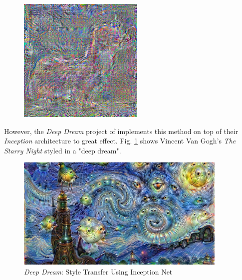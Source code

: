 \documentclass{article}
\begin{document}
\begin{figure}
\begin{minipage}{0.3\linewidth}
    \end{minipage}
    \begin{minipage}{0.3\linewidth}
    \includegraphics[width=\textwidth]{img/other-models/alex-net-x}
    \end{minipage}
\end{figure}

However, the \textit{Deep Dream} project of \cite{deep-dream} implements this
method on top of their \textit{Inception} architecture to great effect. Fig.
\ref{fig:deep-dream} shows Vincent Van Gogh's \textit{The Starry Night}
styled in a "deep dream".

\begin{figure}
\centering
\caption{\textit{Deep Dream}: Style Transfer Using Inception Net}
\label{fig:deep-dream}
\includegraphics[width=0.9\textwidth]{img/deep-dream}
\end{figure}
\end{document}
